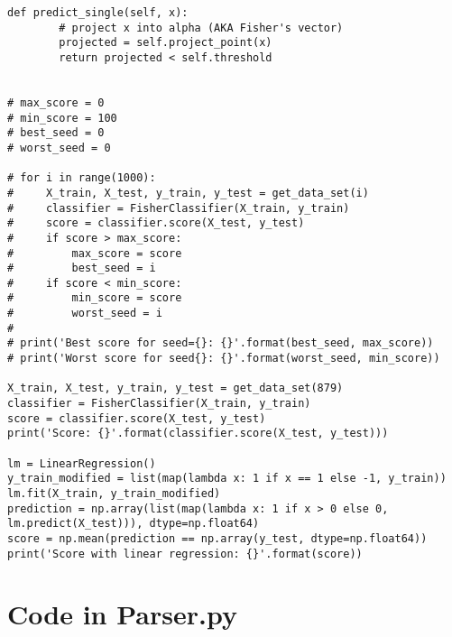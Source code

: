 \begin{lstlisting}[style=py]
    def predict_single(self, x):
        # project x into alpha (AKA Fisher's vector)
        projected = self.project_point(x)
        return projected < self.threshold


# max_score = 0
# min_score = 100
# best_seed = 0
# worst_seed = 0

# for i in range(1000):
#     X_train, X_test, y_train, y_test = get_data_set(i)
#     classifier = FisherClassifier(X_train, y_train)
#     score = classifier.score(X_test, y_test)
#     if score > max_score:
#         max_score = score
#         best_seed = i
#     if score < min_score:
#         min_score = score
#         worst_seed = i
#
# print('Best score for seed={}: {}'.format(best_seed, max_score))
# print('Worst score for seed{}: {}'.format(worst_seed, min_score))

X_train, X_test, y_train, y_test = get_data_set(879)
classifier = FisherClassifier(X_train, y_train)
score = classifier.score(X_test, y_test)
print('Score: {}'.format(classifier.score(X_test, y_test)))

lm = LinearRegression()
y_train_modified = list(map(lambda x: 1 if x == 1 else -1, y_train))
lm.fit(X_train, y_train_modified)
prediction = np.array(list(map(lambda x: 1 if x > 0 else 0, lm.predict(X_test))), dtype=np.float64)
score = np.mean(prediction == np.array(y_test, dtype=np.float64))
print('Score with linear regression: {}'.format(score))

\end{lstlisting}

\section*{Code in Parser.py}

